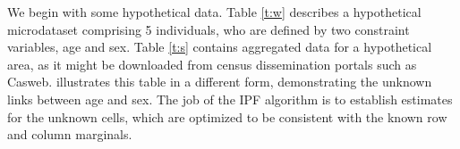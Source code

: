 \documentclass[a4paper,10pt]{article}
\begin{document}

We begin with some hypothetical data.
Table \ref{t:w}  describes a
hypothetical microdataset comprising 5 individuals, who are defined by two
constraint variables, age and sex. 
Table \ref{t:s} contains aggregated data
for a hypothetical area, as it might be downloaded from census dissemination
portals such as Casweb.  illustrates this table in a different form,
demonstrating the unknown links between age and sex. The job of the IPF
algorithm is to establish estimates for the unknown cells, which are
optimized to be consistent with the known row and column marginals.
\end{document}
